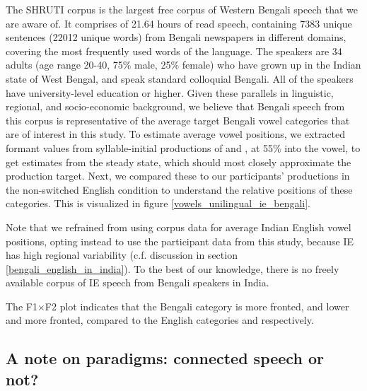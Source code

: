 \documentclass[12 pt]{article}
\newcommand{\nt}[1]{\textipa{[#1]}} %
\begin{document}
The SHRUTI corpus is the largest free corpus of Western Bengali speech that we are aware of. It comprises of 21.64 hours of read speech, containing 7383 unique sentences (22012 unique words) from Bengali newspapers in different domains, covering the most frequently used words of the language. The speakers are 34 adults (age range 20-40, 75\% male, 25\% female) who have grown up in the Indian state of West Bengal, and speak standard colloquial Bengali. All of the speakers have university-level education or higher. Given these parallels in linguistic, regional, and socio-economic background, we believe that Bengali speech from this corpus is representative of the average target Bengali vowel categories that are of interest in this study.
To estimate average vowel positions, we extracted formant values from syllable-initial productions of \nt{\ae} and \nt{a:}, at 55\% into the vowel, to get estimates from the steady state, which should most closely approximate the production target. Next, we compared these to our participants' productions in the non-switched English condition to understand the relative positions of these categories. This is visualized in figure \ref{vowels_unilingual_ie_bengali}. 

Note that we refrained from using corpus data for average Indian English vowel positions, opting instead to use the participant data from this study, because IE has high regional variability (c.f. discussion in section \ref{bengali_english_in_india}). To the best of our knowledge, there is no freely available corpus of IE speech from Bengali speakers in India. 

The F1$\times$F2 plot indicates that the Bengali category \nt{\ae} is more fronted, and \nt{a:} lower and more fronted, compared to the English categories \nt{\ae} and \nt{2} respectively. 

\subsection{A note on paradigms: connected speech or not?} \label{paradigms}
\end{document}
